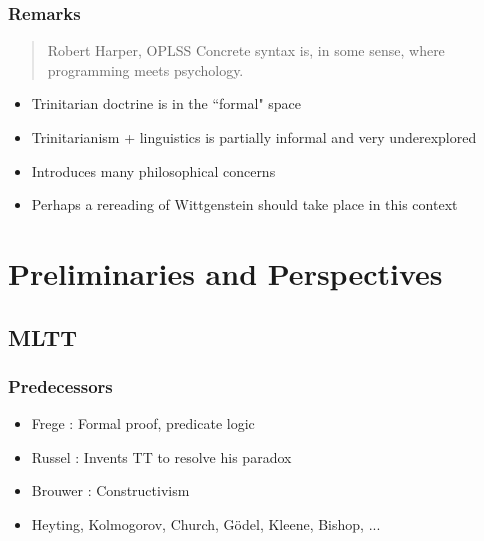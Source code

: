\documentclass[10pt]{beamer}
\begin{document}
\begin{frame}[fragile]
\frametitle{Remarks}

\begin{quote}{Robert Harper, OPLSS}
  Concrete syntax is, in some sense, where programming meets psychology.
\end{quote}

\begin{itemize}
\item Trinitarian doctrine is in the ``formal" space
\item Trinitarianism + linguistics is partially informal and very underexplored
\item Introduces many philosophical concerns
\item Perhaps a rereading of Wittgenstein should take place in this context
\end{itemize}
\end{frame}

\section{Preliminaries and Perspectives}

\subsection{MLTT}

\begin{frame}
\frametitle{Predecessors}

\begin{itemize}
  \item Frege : Formal proof, predicate logic 
  \item Russel : Invents TT to resolve his paradox 
  \item Brouwer : Constructivism
  \item Heyting, Kolmogorov, Church, Gödel, Kleene, Bishop, ...
\end{itemize}

\end{frame}
\end{document}
